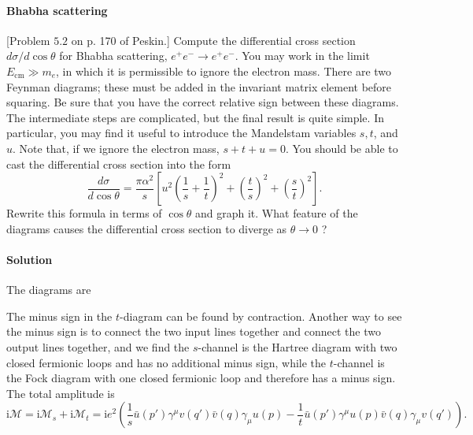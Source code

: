 \documentclass[hyperref, a4paper]{article}
\newcommand*{\ii}{\mathrm{i}}
\begin{document}
\paragraph{}

\paragraph{Bhabha scattering} [Problem $5.2$ on p. 170 of Peskin.] Compute the differential cross section $d \sigma / d \cos \theta$ for Bhabha scattering, $e^{+} e^{-} \rightarrow e^{+} e^{-}$. You may work in the limit $E_{\mathrm{cm}} \gg m_{e}$, in which it is permissible to ignore the electron mass. There are two Feynman diagrams; these must be added in the invariant matrix element before squaring. Be sure that you have the correct relative sign between these diagrams. The intermediate steps are complicated, but the final result is quite simple. In particular, you may find it useful to introduce the Mandelstam variables $s, t$, and $u$. Note that, if we ignore the electron mass, $s+t+u=0$. You should be able to cast the differential cross section into the form
\begin{equation}
    \frac{d \sigma}{d \cos \theta}=\frac{\pi \alpha^{2}}{s}\left[u^{2}\left(\frac{1}{s}+\frac{1}{t}\right)^{2}+\left(\frac{t}{s}\right)^{2}+\left(\frac{s}{t}\right)^{2}\right].
    \label{eq:3-cross-section}
\end{equation}
Rewrite this formula in terms of $\cos \theta$ and graph it. What feature of the diagrams causes the differential cross section to diverge as $\theta \rightarrow 0$ ?

\paragraph{Solution} The diagrams are 


The minus sign in the $t$-diagram can be found by contraction. Another way to see the minus sign is to connect the 
two input lines together and connect the two output lines together, and we find the $s$-channel is the Hartree 
diagram with two closed fermionic loops and has no additional minus sign, while the $t$-channel is the Fock diagram
with one closed fermionic loop and therefore has a minus sign.
The total amplitude is 
\begin{equation}
    \ii \mathcal{M} = \ii \mathcal{M}_s + \ii \mathcal{M}_t = \ii e^2 \left( \frac{1}{s} \bar{u}(p') \gamma^\mu v(q') \bar{v}(q) \gamma_\mu u(p) - \frac{1}{t} \bar{u}(p') \gamma^\mu u(p) \bar{v}(q) \gamma_\mu v(q') \right).
\end{equation}
\end{document}
